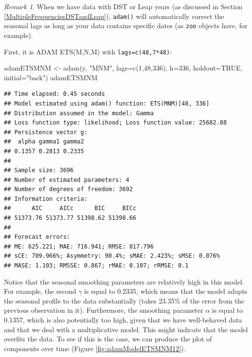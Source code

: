 \documentclass[
]{book}
\newenvironment{Shaded}{\begin{snugshade}}{\end{snugshade}}
\newcommand{\AttributeTok}[1]{\textcolor[rgb]{0.77,0.63,0.00}{#1}}
\newcommand{\ConstantTok}[1]{\textcolor[rgb]{0.00,0.00,0.00}{#1}}
\newcommand{\DecValTok}[1]{\textcolor[rgb]{0.00,0.00,0.81}{#1}}
\newcommand{\FunctionTok}[1]{\textcolor[rgb]{0.00,0.00,0.00}{#1}}
\newcommand{\NormalTok}[1]{#1}
\newcommand{\OtherTok}[1]{\textcolor[rgb]{0.56,0.35,0.01}{#1}}
\newcommand{\StringTok}[1]{\textcolor[rgb]{0.31,0.60,0.02}{#1}}
\theoremstyle{definition}
\theoremstyle{definition}
\theoremstyle{definition}
\theoremstyle{definition}
\theoremstyle{remark}
\newtheorem*{remark}{Remark}
\begin{document}
\begin{remark}
When we have data with DST or Leap years (as discussed in Section \ref{MultipleFrequenciesDSTandLeap}), \texttt{adam()} will automatically correct the seasonal lags as long as your data contains specific dates (as \texttt{zoo} objects have, for example).
\end{remark}

First, it is ADAM ETS(M,N,M) with \texttt{lags=c(48,7*48)}:

\begin{Shaded}
\begin{Highlighting}[]
\NormalTok{adamETSMNM }\OtherTok{\textless{}{-}} \FunctionTok{adam}\NormalTok{(y, }\StringTok{"MNM"}\NormalTok{, }\AttributeTok{lags=}\FunctionTok{c}\NormalTok{(}\DecValTok{1}\NormalTok{,}\DecValTok{48}\NormalTok{,}\DecValTok{336}\NormalTok{),}
                   \AttributeTok{h=}\DecValTok{336}\NormalTok{, }\AttributeTok{holdout=}\ConstantTok{TRUE}\NormalTok{,}
                   \AttributeTok{initial=}\StringTok{"back"}\NormalTok{)}
\NormalTok{adamETSMNM}
\end{Highlighting}
\end{Shaded}

\begin{verbatim}
## Time elapsed: 0.45 seconds
## Model estimated using adam() function: ETS(MNM)[48, 336]
## Distribution assumed in the model: Gamma
## Loss function type: likelihood; Loss function value: 25682.88
## Persistence vector g:
##  alpha gamma1 gamma2 
## 0.1357 0.2813 0.2335 
## 
## Sample size: 3696
## Number of estimated parameters: 4
## Number of degrees of freedom: 3692
## Information criteria:
##      AIC     AICc      BIC     BICc 
## 51373.76 51373.77 51398.62 51398.66 
## 
## Forecast errors:
## ME: 625.221; MAE: 716.941; RMSE: 817.796
## sCE: 709.966%; Asymmetry: 90.4%; sMAE: 2.423%; sMSE: 0.076%
## MASE: 1.103; RMSSE: 0.867; rMAE: 0.107; rRMSE: 0.1
\end{verbatim}

Notice that the seasonal smoothing parameters are relatively high in this model. For example, the second \(\gamma\) is equal to 0.2335, which means that the model adapts the seasonal profile to the data substantially (takes 23.35\% of the error from the previous observation in it). Furthermore, the smoothing parameter \(\alpha\) is equal to 0.1357, which is also potentially too high, given that we have well-behaved data and that we deal with a multiplicative model. This might indicate that the model overfits the data. To see if this is the case, we can produce the plot of components over time (Figure \ref{fig:adamModelETSMNM12}).
\end{document}
